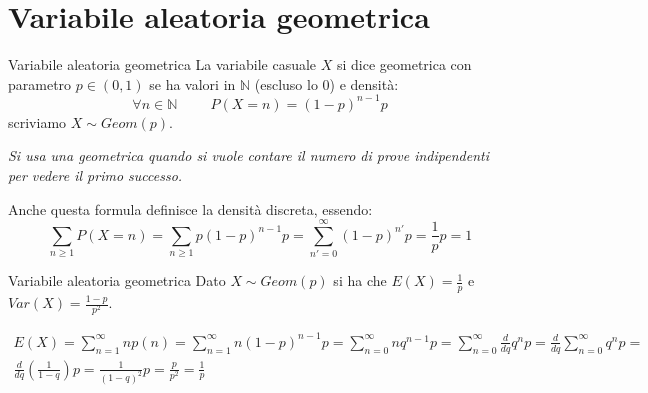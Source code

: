 \section{Variabile aleatoria geometrica}
\begin{Definition}{Variabile aleatoria geometrica}{}
    La variabile casuale $X$ si dice geometrica con parametro $p\in(0,1)$ se ha valori in $\mathbb{N}$ (escluso lo 0) e densità:
    \begin{equation*}
        \forall n\in\mathbb{N}\hspace{1cm}P(X=n)=(1-p)^{n-1}p
    \end{equation*}
    scriviamo $X\sim Geom(p)$. 
    
    \textit{Si usa una geometrica quando si vuole contare il numero di prove indipendenti per vedere il primo successo.}
\end{Definition}

Anche questa formula definisce la densità discreta, essendo:
\begin{equation*}
    \sum_{n\geq1}P(X=n)=\sum_{n\geq1}p(1-p)^{n-1}p=\sum_{n'=0}^\infty(1-p)^{n'}p=\frac{1}{p}p=1
\end{equation*}

\begin{Lemma}{Variabile aleatoria geometrica}{}
    Dato $X\sim Geom(p)$ si ha che $E(X)=\frac{1}{p}$ e $Var(X)=\frac{1-p}{p^2}$.
    \begin{demonstration}
        \begin{align*}
            E(X)=\sum_{n=1}^\infty np(n)=\sum_{n=1}^\infty n(1-p)^{n-1}p=\sum_{n=0}^\infty nq^{n-1}p=\sum_{n=0}^\infty \frac{d}{dq}q^np=\frac{d}{dq}\sum_{n=0}^\infty  q^np=\\\frac{d}{dq}(\frac{1}{1-q})p=\frac{1}{(1-q)^2}p=\frac{p}{p^2}=\frac{1}{p}
        \end{align*}
    \end{demonstration}
\end{Lemma}

